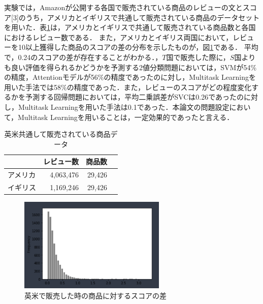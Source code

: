 \documentclass[dvipdfmx,twocolumn,10.5pt]{jsarticle}
\begin{document}
実験では，Amazonが公開する各国で販売されている商品のレビューの文とスコア[3]のうち，アメリカとイギリスで共通して販売されている商品のデータセットを用いた．表\ref{num_of_data}は，アメリカとイギリスで共通して販売されている商品数と各国におけるレビュー数である．
また，アメリカとイギリス両国において，レビューを10以上獲得した商品のスコアの差の分布を示したものが，図\ref{score_diff}である．
平均で，0.24のスコアの差が存在することがわかる．，$T$国で販売した際に，$S$国よりも良い評価を得られるかどうかを予測する2値分類問題においては，SVMが54\%の精度，Attentionモデルが56\%の精度であったのに対し，Multitask Learningを用いた手法では58\%の精度であった．また，レビューのスコアがどの程度変化するかを予測する回帰問題においては，平均二乗誤差がSVCは0.26であったのに対し，Multitask Learningを用いた手法は0.1であった．本論文の問題設定において，Multitask Learningを用いることは，一定効果的であったと言える．

\begin{table}[tb]
\centering
\caption{英米共通して販売されている商品データ}
\begin{tabular}{lrrr}
\hline
\multicolumn{1}{c}{} & \multicolumn{1}{c}{レビュー数} & \multicolumn{1}{c}{商品数} \\ \hline
アメリカ         & 4,063,476                          & 29,426             \\
イギリス         & 1,169,246                         & 29,426                 \\ \hline
\end{tabular}
\label{num_of_data}
\end{table}

\begin{figure}[tb]
	\centering
	\includegraphics[width=7cm]{images/score_diff.png} 
	\caption{英米で販売した時の商品に対するスコアの差}
	\label{score_diff}
\end{figure}
\end{document}
